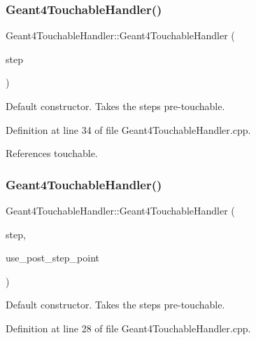 \subsubsection{\texorpdfstring{Geant4\+Touchable\+Handler()}{Geant4TouchableHandler()}\hspace{0.1cm}{\footnotesize\ttfamily [2/3]}}
{\footnotesize\ttfamily Geant4\+Touchable\+Handler\+::\+Geant4\+Touchable\+Handler (\begin{DoxyParamCaption}\item[{const G4\+Step $\ast$}]{step }\end{DoxyParamCaption})}



Default constructor. Takes the step\textquotesingle{}s pre-\/touchable. 



Definition at line 34 of file Geant4\+Touchable\+Handler.\+cpp.



References touchable.

\hypertarget{class_d_d4hep_1_1_simulation_1_1_geant4_touchable_handler_ac4e6b8879c60c24faac7389def633092}{}\label{class_d_d4hep_1_1_simulation_1_1_geant4_touchable_handler_ac4e6b8879c60c24faac7389def633092} 
\subsubsection{\texorpdfstring{Geant4\+Touchable\+Handler()}{Geant4TouchableHandler()}\hspace{0.1cm}{\footnotesize\ttfamily [3/3]}}
{\footnotesize\ttfamily Geant4\+Touchable\+Handler\+::\+Geant4\+Touchable\+Handler (\begin{DoxyParamCaption}\item[{const G4\+Step $\ast$}]{step,  }\item[{bool}]{use\+\_\+post\+\_\+step\+\_\+point }\end{DoxyParamCaption})}



Default constructor. Takes the step\textquotesingle{}s pre-\/touchable. 



Definition at line 28 of file Geant4\+Touchable\+Handler.\+cpp.



